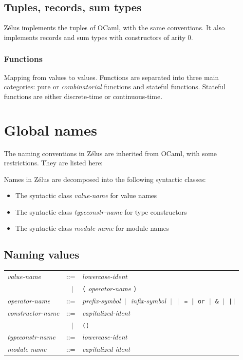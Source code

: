 \documentclass[11pt,titlepage,twoside]{report}
\newcommand{\zelus}{{\sf Z\'elus}}
\newcommand{\ocaml}{{\sf OCaml}}
\newcommand{\alt}{\;|\;}
\newcommand{\term}[1]{{\tt #1}}
\newcommand{\nterm}[1]{{\em #1}}
\begin{document}
\subsection{Tuples, records, sum types\label{tuplesrecords}} %

\zelus{} implements the tuples of \ocaml, with the same conventions. It
also implements records and sum types with constructors of arity 0.

\subsubsection{Functions\label{funcvalues}} %
Mapping from values to values. Functions are separated into three main
categories: pure or \emph{combinatorial} functions and stateful functions. Stateful
functions are either discrete-time or continuous-time.

\section{Global names\label{global-names}} %

The naming conventions in \zelus{} are inherited from \ocaml, with some
restrictions. They are listed here:

Names in \zelus{} are decomposed into the following syntactic classes:
\begin{itemize}
\item
  The syntactic class \nterm{value-name} for value names
\item
  The syntactic class \nterm{typeconstr-name} for type constructors
\item
  The syntactic class \nterm{module-name} for module names
\end{itemize}

\subsection{Naming values\label{namingvalues}} %

\begin{center}
\begin{tabular}{lcl}
\nterm{value-name}       & ::=    & \nterm{lowercase-ident} \\
                         & $\;\;\alt$ & \term{(} \nterm{operator-name}
                                        \term{)} \\
\nterm{operator-name}    & ::=    & \nterm{prefix-symbol} 
                           $\alt$   \nterm{infix-symbol} 
                           $\alt$   \term{*} $\alt$ \term{=} $\alt$ \term{or}
                           $\alt$   \term{\&} $\alt$ \term{||} \\
\nterm{constructor-name} & ::=    & \nterm{capitalized-ident} \\
                         & $\;\;\alt$ & \term{()} \\
\nterm{typeconstr-name}  & ::=    & \nterm{lowercase-ident} \\
\nterm{module-name}      & ::=    & \nterm{capitalized-ident}
\end{tabular}
\end{center}
\end{document}
